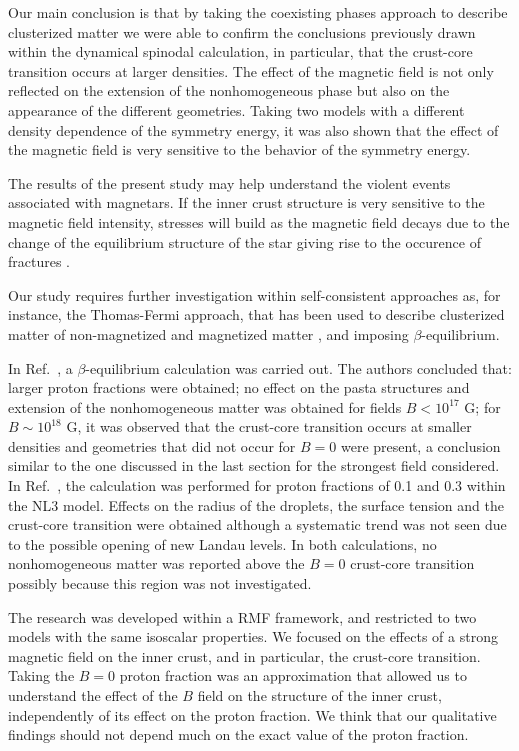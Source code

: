 \documentclass[epj]{svjour}
\begin{document}
Our main conclusion is that by taking
 the coexisting phases approach to describe clusterized matter we were able to  confirm the conclusions previously drawn within the
dynamical spinodal calculation, in particular, that the crust-core
transition occurs at larger densities. The effect of the magnetic field is not only reflected on
the extension of the nonhomogeneous phase but also on the appearance
of the different geometries.  Taking two models with a different  density dependence of the
symmetry energy, it was also shown that the effect of the
magnetic field is very sensitive to the behavior of the symmetry energy.

The results of the present study  may help understand the violent
events associated with magnetars. If the inner crust structure is very
sensitive to the magnetic field intensity, stresses will build as the
magnetic field decays due to the change of the equilibrium structure of
the star giving rise to the occurence of fractures \cite{Lander2016,Lander2019,Lander2020}.

Our study requires  further investigation within
self-consistent approaches as, for instance, the Thomas-Fermi approach,  that has been
used to describe clusterized matter of non-magnetized
\cite{Maruyama2005,Avancini-08,Avancini-10,Grill2012,Bao-14} and
magnetized matter \cite{Lima-13,Bao21}, and imposing
  $\beta$-equilibrium. 

In Ref.~\cite{Bao21},  a $\beta$-equilibrium
calculation was carried out. The authors concluded that: larger proton fractions were obtained; no effect on the pasta structures and extension of the
nonhomogeneous matter was obtained for fields $B<10^{17}$
G;  for $B\sim 10^{18}$ G, it was observed that the crust-core
transition occurs at smaller densities and geometries that did not
occur for $B=0$ were present, a  conclusion similar to the one discussed in the
last section for
the strongest field considered.
 In Ref.~\cite{Lima-13}, the
calculation was performed for  proton fractions of 0.1 and
0.3 within the NL3 model. Effects on the radius of the droplets, the
surface tension and the crust-core transition were obtained although a
systematic trend was not seen due to the possible opening of new 
 Landau levels. In both calculations, no nonhomogeneous matter
was reported above the $B=0$ crust-core transition possibly because
this region was not investigated.

 The research was developed within a RMF framework, and restricted to two
models with the same isoscalar properties. We focused on
the effects of a strong magnetic field on the inner crust, and in
particular, the crust-core transition.  Taking the  $B=0$ proton fraction
was an approximation that  allowed us to understand the effect of the $B$ field on the structure of the
inner crust, independently of its effect on the proton fraction. We
think that our qualitative findings should not depend much on the exact value of the proton fraction.
\end{document}

